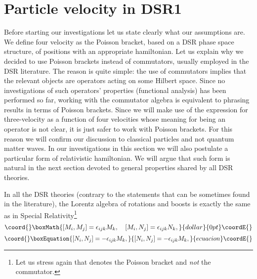 \documentclass  [12pt] {article}
\begin{document}
\section{Particle velocity in DSR1}


Before starting our investigations let us state clearly what our
assumptions are. We define four velocity as the Poisson bracket,
based on a DSR phase space structure, of positions with an
appropriate hamiltonian. Let us explain why we decided to use
Poisson brackets instead of commutators, usually employed in the
DSR literature. The reason is quite simple: the use of commutators
implies that the relevant objects are operators acting on some
Hilbert space. Since no investigations of such operators'
properties  (functional analysis) has been performed so far,
working with the commutator algebra is equivalent to phrasing
results in terms of Poisson brackets. Since we will make use of
the expression for three-velocity as a function of four velocities
\coordHE{} whose meaning for \coordHE{} being an
operator is not clear, it is just safer to work with Poisson
brackets. For this reason we will confirm our discussion to
classical particles and not quantum matter waves. In our
investigations in this section we will also postulate a particular
form of relativistic hamiltonian. We will argue that such form is
natural in the next section devoted to general properties shared
by all DSR theories.

In all the DSR theories (contrary to the statements that can be sometimes found
in the literature), the Lorentz algebra of rotations \coordHE{} and boosts \coordHE{} is
exactly the same as in Special Relativity\footnote{Let us stress again that
\myHighlight{$[\ast,\ast]$}\coordHE{} denotes the Poisson bracket and {\em not} the commutator.}
$$\coord{}\boxMath{
[M_i, M_j] =  \epsilon_{ijk} M_k, \quad [M_i, N_j] =  \epsilon_{ijk} N_k,
}{dollar}{0pt}\coordE{}$$
\begin{equation}\coord{}\boxEquation{\label{1}
  [N_i, N_j] = - \epsilon_{ijk} M_k,
}{[N_i, N_j] = - \epsilon_{ijk} M_k,
}{ecuacion}\coordE{}\end{equation}
\end{document}
